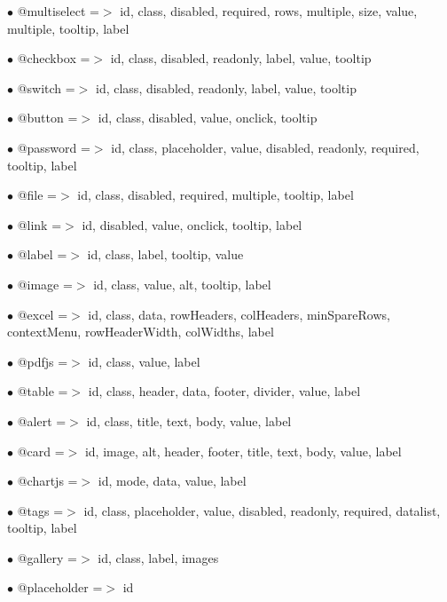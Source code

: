 \documentclass[a4paper]{book}
\begin{document}
\begin{compactitem}
\item[\color{myblue}$\bullet$] @multiselect =$>$ id, class, disabled, required, rows, multiple, size, value, multiple, tooltip, label
\item[\color{myblue}$\bullet$] @checkbox    =$>$ id, class, disabled, readonly, label, value, tooltip
\item[\color{myblue}$\bullet$] @switch      =$>$ id, class, disabled, readonly, label, value, tooltip
\item[\color{myblue}$\bullet$] @button      =$>$ id, class, disabled, value, onclick, tooltip
\item[\color{myblue}$\bullet$] @password    =$>$ id, class, placeholder, value, disabled, readonly, required, tooltip, label
\item[\color{myblue}$\bullet$] @file        =$>$ id, class, disabled, required, multiple, tooltip, label
\item[\color{myblue}$\bullet$] @link        =$>$ id, disabled, value, onclick, tooltip, label
\item[\color{myblue}$\bullet$] @label       =$>$ id, class, label, tooltip, value
\item[\color{myblue}$\bullet$] @image       =$>$ id, class, value, alt, tooltip, label
\item[\color{myblue}$\bullet$] @excel       =$>$ id, class, data, rowHeaders, colHeaders, minSpareRows, contextMenu, rowHeaderWidth,
                colWidths, label
\item[\color{myblue}$\bullet$] @pdfjs       =$>$ id, class, value, label
\item[\color{myblue}$\bullet$] @table       =$>$ id, class, header, data, footer, divider, value, label
\item[\color{myblue}$\bullet$] @alert       =$>$ id, class, title, text, body, value, label
\item[\color{myblue}$\bullet$] @card        =$>$ id, image, alt, header, footer, title, text, body, value, label
\item[\color{myblue}$\bullet$] @chartjs     =$>$ id, mode, data, value, label
\item[\color{myblue}$\bullet$] @tags        =$>$ id, class, placeholder, value, disabled, readonly, required, datalist, tooltip, label
\item[\color{myblue}$\bullet$] @gallery     =$>$ id, class, label, images
\item[\color{myblue}$\bullet$] @placeholder =$>$ id
\end{compactitem}
\end{document}
